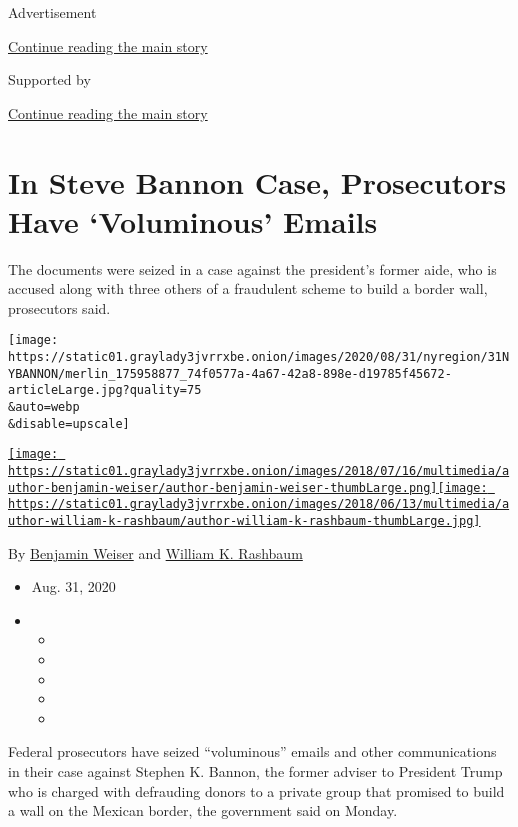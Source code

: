 Advertisement

\protect\hyperlink{after-top}{Continue reading the main story}

Supported by

\protect\hyperlink{after-sponsor}{Continue reading the main story}

\hypertarget{in-steve-bannon-case-prosecutors-have-voluminous-emails}{%
\section{In Steve Bannon Case, Prosecutors Have `Voluminous'
Emails}\label{in-steve-bannon-case-prosecutors-have-voluminous-emails}}

The documents were seized in a case against the president's former aide,
who is accused along with three others of a fraudulent scheme to build a
border wall, prosecutors said.

\texttt{[image: https://static01.graylady3jvrrxbe.onion/images/2020/08/31/nyregion/31NYBANNON/merlin\_175958877\_74f0577a-4a67-42a8-898e-d19785f45672-articleLarge.jpg?quality=75\\\&auto=webp\\\&disable=upscale]}

\href{https://www.nytimes3xbfgragh.onion/by/benjamin-weiser}{\texttt{[image: https://static01.graylady3jvrrxbe.onion/images/2018/07/16/multimedia/author-benjamin-weiser/author-benjamin-weiser-thumbLarge.png]}}\href{https://www.nytimes3xbfgragh.onion/by/william-k-rashbaum}{\texttt{[image: https://static01.graylady3jvrrxbe.onion/images/2018/06/13/multimedia/author-william-k-rashbaum/author-william-k-rashbaum-thumbLarge.jpg]}}

By \href{https://www.nytimes3xbfgragh.onion/by/benjamin-weiser}{Benjamin
Weiser} and
\href{https://www.nytimes3xbfgragh.onion/by/william-k-rashbaum}{William
K. Rashbaum}

\begin{itemize}
\item
  Aug. 31, 2020
\item
  \begin{itemize}
  \item
  \item
  \item
  \item
  \item
  \end{itemize}
\end{itemize}

Federal prosecutors have seized ``voluminous'' emails and other
communications in their case against Stephen K. Bannon, the former
adviser to President Trump who is charged with defrauding donors to a
private group that promised to build a wall on the Mexican border, the
government said on Monday.

